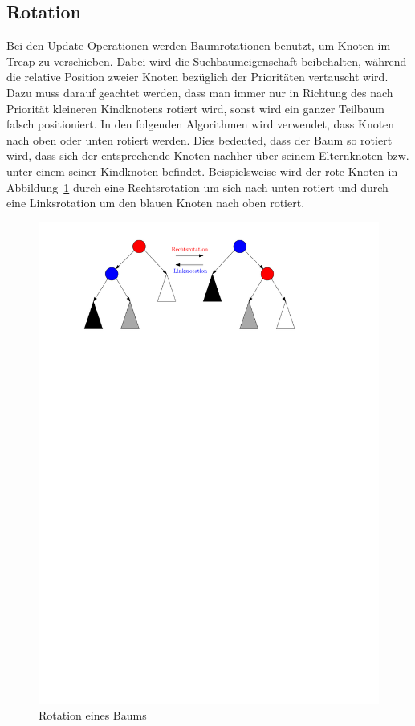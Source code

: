 \documentclass[a4paper]{scrreprt}
\theoremstyle{definition}
\begin{document}
\subsection{Rotation}
\label{sec:rotation}
Bei den Update-Operationen werden Baumrotationen benutzt, um Knoten im Treap zu verschieben.
Dabei wird die Suchbaumeigenschaft beibehalten, während die relative Position zweier Knoten bezüglich der Prioritäten vertauscht wird.
Dazu muss darauf geachtet werden, dass man immer nur in Richtung des nach Priorität kleineren Kindknotens rotiert wird, sonst wird ein ganzer Teilbaum falsch positioniert.
In den folgenden Algorithmen wird verwendet, dass Knoten nach oben oder unten rotiert werden.
Dies bedeuted, dass der Baum so rotiert wird, dass sich der entsprechende Knoten nachher über seinem Elternknoten bzw. unter einem seiner Kindknoten befindet.
Beispielsweise wird der rote Knoten in Abbildung~\ref{fig:rotation} durch eine Rechtsrotation um sich nach unten rotiert und durch eine Linksrotation um den blauen Knoten nach oben rotiert.
\begin{figure}
\includegraphics{img/Tree_Rotation_color.pdf}
\caption[Rotation eines Baums]{Rotation eines Baums}
\label{fig:rotation}
\end{figure}
\end{document}
